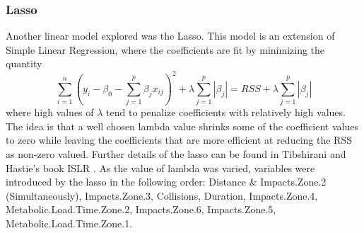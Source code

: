 \subsubsection {Lasso}
Another linear model explored was the Lasso. This model is an extension of Simple Linear Regression, where the coefficients are fit by minimizing the quantity \[\sum_{i=1}^{n} (y_i-\beta_0-\sum_{j=1}^{p}\beta_jx_{ij})^2 + \lambda\sum_{j=1}^{p}|\beta_j| = RSS + \lambda\sum_{j=1}^{p}|\beta_j| \]
where high values of $\lambda$  tend to penalize coefficients with relatively high values. The idea is that a well chosen lambda value shrinks some of the coefficient values to zero while leaving the coefficients that are more efficient at reducing the RSS as non-zero valued. Further details of the lasso can be found in Tibshirani and Hastie's book ISLR \cite{ISLR}. As the value of lambda was varied, variables were introduced by the lasso in the following order: Distance \& Impacts.Zone.2 (Simultaneously), Impacts.Zone.3, Collisions, Duration, Impacts.Zone.4, Metabolic.Load.Time.Zone.2, Impacts.Zone.6, Impacts.Zone.5, Metabolic.Load.Time.Zone.1.


